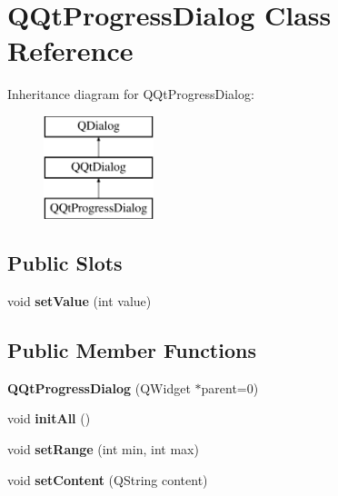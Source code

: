 \hypertarget{class_q_qt_progress_dialog}{}\section{Q\+Qt\+Progress\+Dialog Class Reference}
\label{class_q_qt_progress_dialog}
Inheritance diagram for Q\+Qt\+Progress\+Dialog\+:\begin{figure}[H]
\begin{center}
\leavevmode
\includegraphics[height=3.000000cm]{class_q_qt_progress_dialog}
\end{center}
\end{figure}
\subsection*{Public Slots}
\begin{DoxyCompactItemize}
\item 
\mbox{\label{class_q_qt_progress_dialog_ab58f1690e673e142011d022cf9837fff}} 
void {\bfseries set\+Value} (int value)
\end{DoxyCompactItemize}
\subsection*{Public Member Functions}
\begin{DoxyCompactItemize}
\item 
\mbox{\label{class_q_qt_progress_dialog_adf37ddf637c547bfc575c5ea3637dba9}} 
{\bfseries Q\+Qt\+Progress\+Dialog} (Q\+Widget $\ast$parent=0)
\item 
\mbox{\label{class_q_qt_progress_dialog_a9f8404aca091fd0eacdeef06e393fc1a}} 
void {\bfseries init\+All} ()
\item 
\mbox{\label{class_q_qt_progress_dialog_a48f4d1101bc0fe2f80cb3e899668e475}} 
void {\bfseries set\+Range} (int min, int max)
\item 
\mbox{\label{class_q_qt_progress_dialog_a75d7e6f9acc3f662bceab837970d9994}} 
void {\bfseries set\+Content} (Q\+String content)
\end{DoxyCompactItemize}
